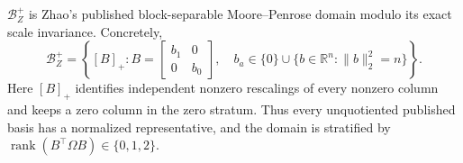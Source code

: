 \(\mathcal B_Z^+\) is Zhao's published block-separable Moore--Penrose domain modulo its exact scale invariance.  Concretely,
\[
 \mathcal B_Z^+=
 \left\{[B]_+:B=\begin{bmatrix}b_1&0\\0&b_0\end{bmatrix},\quad
 b_a\in\{0\}\cup\{b\in\mathbb R^n:\lVert b\rVert_2^2=n\}\right\}.
\]
Here \([B]_+\) identifies independent nonzero rescalings of every nonzero column and keeps a zero column in the zero stratum.  Thus every unquotiented published basis has a normalized representative, and the domain is stratified by \(\operatorname{rank}(B^{\top}\Omega B)\in\{0,1,2\}\).